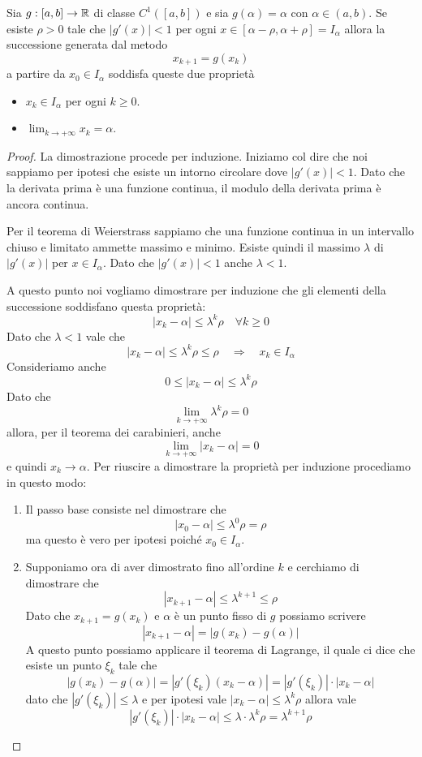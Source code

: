 \begin{theorem}\label{th: punto_fisso}
	Sia $g : [a, b] \to \mathbb{R}$ di classe $C^1 ([a, b])$ e sia $g(\alpha) = \alpha$ con $\alpha \in (a,b)$. Se esiste
	$\rho > 0$ tale che $|g'(x)| < 1$ per ogni $x \in [\alpha - \rho, \alpha + \rho] = I_\alpha$ allora la
	successione generata dal metodo
	\[ x_{k+1} = g(x_k) \]
	a partire da $x_0 \in I_\alpha$ soddisfa queste due proprietà
	\begin{itemize}
		\item $x_k \in I_\alpha$ per ogni $k \geq 0$.
		\item $\lim_{k \to +\infty} x_k = \alpha$.
	\end{itemize}
	\begin{proof}
		La dimostrazione procede per induzione. Iniziamo col dire che noi sappiamo per ipotesi che esiste un
		intorno circolare dove $|g'(x)| < 1$. Dato che la derivata prima è una funzione continua, il modulo
		della derivata prima è ancora continua.

		Per il teorema di Weierstrass sappiamo che una funzione continua in un intervallo chiuso e limitato
		ammette massimo e minimo. Esiste quindi il massimo $\lambda$ di $|g'(x)|$ per $x \in I_\alpha$.
		Dato che $|g'(x)| < 1$ anche $\lambda < 1$.

		A questo punto noi vogliamo dimostrare per induzione che gli elementi della successione soddisfano
		questa proprietà:
		\[ |x_k - \alpha| \leq \lambda^k \rho \quad \forall k \geq 0 \]
		Dato che $\lambda < 1$ vale che
		\[ |x_k - \alpha| \leq \lambda^k \rho \leq \rho \quad \Rightarrow \quad x_k \in I_\alpha \]
		Consideriamo anche
		\[ 0 \leq |x_k - \alpha| \leq \lambda^k \rho \]
		Dato che
		\[ \lim_{k \to +\infty} \lambda^k \rho = 0\]
		allora, per il teorema dei carabinieri, anche
		\[ \lim_{k \to +\infty} |x_k - \alpha| = 0 \]
		e quindi $x_k \to \alpha$. Per riuscire a dimostrare la proprietà per induzione procediamo in questo modo:
		\begin{enumerate}
			\item Il passo base consiste nel dimostrare che
			      \[ |x_0 - \alpha| \leq \lambda^0 \rho = \rho \]
			      ma questo è vero per ipotesi poiché $x_0 \in I_\alpha$.
			\item Supponiamo ora di aver dimostrato fino all'ordine $k$ e cerchiamo di dimostrare che
			      \[ |x_{k+1} - \alpha| \leq \lambda^{k+1} \leq \rho \]
			      Dato che $x_{k+1} = g(x_k)$ e $\alpha$ è un punto fisso di $g$ possiamo scrivere
			      \[ |x_{k+1} - \alpha| = |g(x_k) - g(\alpha)| \]
			      A questo punto possiamo applicare il teorema di Lagrange, il quale ci dice che esiste un punto
			      $\xi_k$ tale che
			      \[ |g(x_k) - g(\alpha)| = |g'(\xi_k) (x_k - \alpha)| = |g'(\xi_k)| \cdot |x_k - \alpha| \]
			      dato che $|g'(\xi_k)| \leq \lambda$ e per ipotesi vale $|x_k - \alpha| \leq \lambda^k \rho$
			      allora vale
			      \[ |g'(\xi_k)| \cdot |x_k - \alpha| \leq \lambda \cdot \lambda^k \rho = \lambda^{k+1} \rho \]
		\end{enumerate}
	\end{proof}
\end{theorem}

